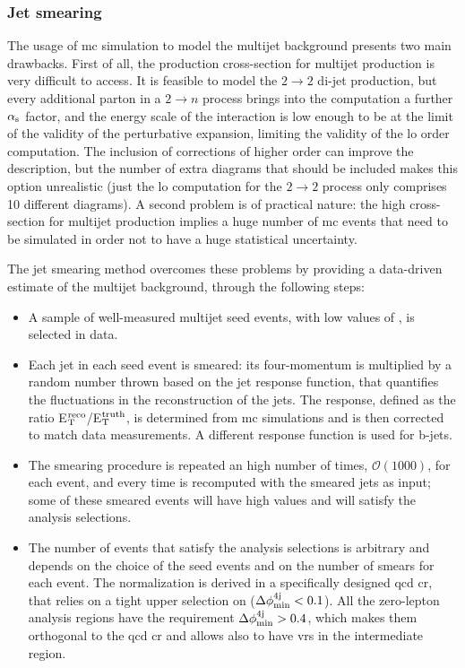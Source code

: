 \subsubsection*{Jet smearing}
\label{sec:jet_smearing}

The usage of \gls{mc} simulation to model the multijet background presents two main drawbacks.
First of all, the production cross-section for multijet production is very difficult to access. 
It is feasible to model the $2 \to 2$ di-jet production, 
but every additional parton in a $2 \to n$ process brings into the computation a further $\alpha_{\rm{s}}$ factor, 
and the energy scale of the interaction is low enough to be at the limit of the validity of the perturbative expansion, limiting the validity of the \gls{lo} order computation. The inclusion of corrections of higher order can improve the description, but the number of extra diagrams that should be included makes this option unrealistic (just the \gls{lo} computation for the $2 \to 2$ process only comprises 10 different diagrams).
A second problem is of practical nature: the high cross-section for multijet production implies a huge number of \gls{mc} events that need to be simulated in order not to have a huge statistical uncertainty. 

The jet smearing method overcomes these problems by providing a data-driven estimate of the multijet background, through the following steps:
\begin{itemize}
\item A sample of well-measured multijet seed events, with low values of \met, is selected in data.

\item Each jet in each seed event is smeared: its four-momentum is multiplied by a random number thrown based on the jet response function, that quantifies the fluctuations in the \pt reconstruction of the jets. The response, defined as the ratio E$_{\rm{T}}^{\rm{reco}}$/E$_{\rm{T}}^{\rm{truth}}$, is determined from \gls{mc} simulations and is then corrected to match data measurements. 
A different response function is used for b-jets. 

\item The smearing procedure is repeated an high number of times, $\mathcal{O}(1000)$, for each event, and every time \met is recomputed with the smeared jets as input; some of these smeared events will have high \met values and will satisfy the analysis selections.

\item The number of events that satisfy the analysis selections is arbitrary and depends on the choice of the seed events and on the number of smears for each event. The normalization is derived in a specifically designed \gls{qcd} \gls{cr}, that relies on a tight upper selection on \dphimin ($\Delta\phi_{\rm{min}}^{4{\rm{j}}} < 0.1$). All the zero-lepton analysis regions have the requirement $\Delta\phi_{\rm{min}}^{4{\rm{j}}} > 0.4$, which makes them orthogonal to the \gls{qcd} \gls{cr} and allows also to have \glspl{vr} in the intermediate region. 
\end{itemize}

